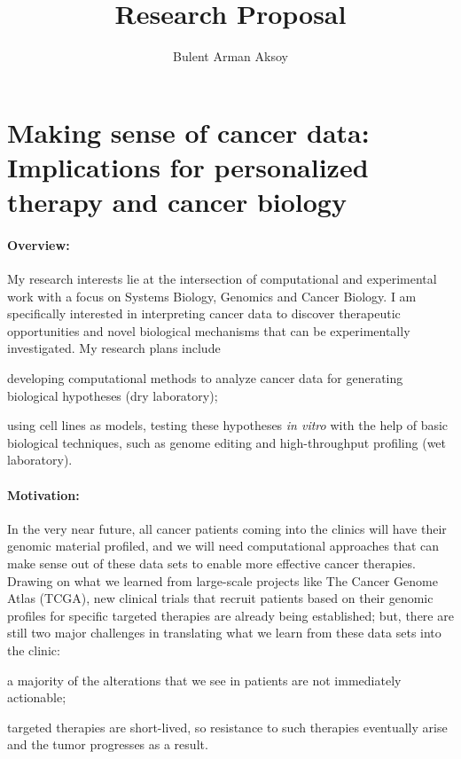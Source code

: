 \documentclass[11pt,letterpaper]{article}
\title{Research Proposal}
\author{Bulent Arman Aksoy}
\date{}
\begin{document}
\maketitle

\section*{Making sense of cancer data: Implications for personalized therapy and cancer biology}
\paragraph{Overview:}
My research interests lie at the intersection of computational and experimental work with a focus on Systems Biology, Genomics and Cancer Biology.
I am specifically interested in interpreting cancer data to discover therapeutic opportunities and novel biological mechanisms that can be experimentally investigated.
My research plans include
\begin{inparaenum}[(i)]
 \item developing computational methods to analyze cancer data for generating biological hypotheses (dry laboratory);
 \item using cell lines as models, testing these hypotheses \textit{in vitro} with the help of basic biological techniques, such as genome editing and high-throughput profiling (wet laboratory).
\end{inparaenum}

\paragraph{Motivation:}
In the very near future, all cancer patients coming into the clinics will have their genomic material profiled,
and we will need computational approaches that can make sense out of these data sets to enable more effective cancer therapies.
Drawing on what we learned from large-scale projects like The Cancer Genome Atlas (TCGA), 
new clinical trials that recruit patients based on their genomic profiles for specific targeted therapies are already being established;
but, there are still two major challenges in translating what we learn from these data sets into the clinic:
\begin{inparaenum}[(i)]
 \item a majority of the alterations that we see in patients are not immediately actionable;
 \item targeted therapies are short-lived, so resistance to such therapies eventually arise and the tumor progresses as a result.
\end{inparaenum}
\end{document}
